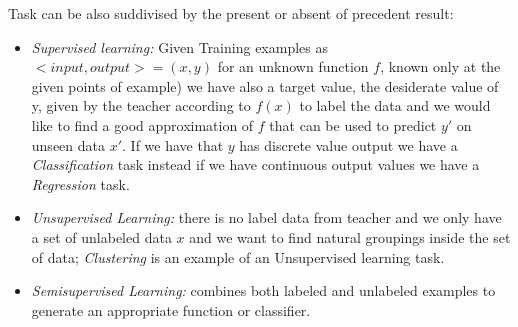 \begin{description}
\begin{description}
                   \end{description}
                   Task can be also suddivised by the present or absent of precedent result:
                   \begin{itemize}
                        \item \emph{Supervised learning: } Given Training examples as $<input, output> = (x, y)$
                               for an unknown function $f$, known only at the given points of example) we have also
                               a target value, the desiderate value of y, given by the teacher according to $f(x)$
                               to label the data and we would like to find a good approximation of $f$ that can 
                               be used to predict $y'$ on unseen data $x'$.\newline
                               If we have that $y$ has discrete value output we have a \emph{Classification} task
                               instead if we have continuous output values we have a \emph{Regression} task.

                        \item \emph{Unsupervised Learning:} there is no label data from teacher and we only
                              have a set of unlabeled data $x$ and we want to find natural groupings inside
                              the set of data; \emph{Clustering} is an example of an Unsupervised learning task.

                        \item \emph{Semisupervised Learning: } combines both labeled and unlabeled examples
                              to generate an appropriate function or classifier.


\end{itemize}
\end{description}

